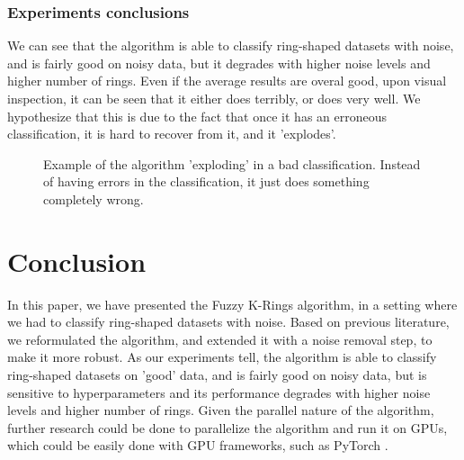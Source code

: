 \documentclass[conference]{IEEEtran}
\begin{document}
\subsubsection{Experiments conclusions}
We can see that the algorithm is able to classify ring-shaped datasets with noise, and is fairly good on noisy data, but it degrades with higher noise levels and higher number of rings.
Even if the average results are overal good, upon visual inspection, it can be seen that it either does terribly, or does very well. We hypothesize that this is due
to the fact that once it has an erroneous classification, it is hard to recover from it, and it 'explodes'.

\begin{figure}
    \centering
    \resizebox{0.65\linewidth}{!}{}
    \label{fig:bad_class}
    \caption{Example of the algorithm 'exploding' in a bad classification. Instead of having errors in the classification, it just does something completely wrong.}
\end{figure}

\section{Conclusion}
In this paper, we have presented the Fuzzy K-Rings algorithm, in a setting where we had to classify ring-shaped datasets with noise. Based on previous literature,
we reformulated the algorithm, and extended it with a noise removal step, to make it more robust. As our experiments tell, the algorithm is able to classify ring-shaped datasets
on 'good' data, and is fairly good on noisy data, but is sensitive to hyperparameters and its performance degrades with higher noise levels and higher number of rings.
Given the parallel nature of the algorithm, further research could be done to parallelize the algorithm and run it on GPUs, which could be easily done with GPU frameworks,
such as PyTorch \cite{paszke2019pytorch}.




\end{document}

